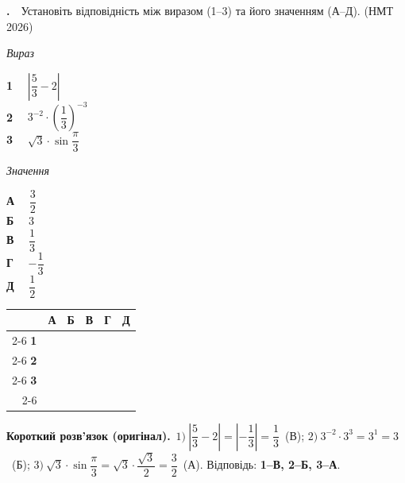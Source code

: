 \documentclass[12pt]{article}
\newcommand{\matchingGrid}{%
    \begingroup
    \renewcommand{\arraystretch}{1.15}
    \setlength{\tabcolsep}{4pt}
    \footnotesize
    \begin{tabular}{r|c|c|c|c|c|}
         \multicolumn{1}{c}{} & \multicolumn{1}{c}{\textbf{А}} & \multicolumn{1}{c}{\textbf{Б}} & \multicolumn{1}{c}{\textbf{В}} & \multicolumn{1}{c}{\textbf{Г}} & \multicolumn{1}{c}{\textbf{Д}} \\ \cline{2-6}
         \textbf{1} & \phantom{X} & \phantom{X} & \phantom{X} & \phantom{X} & \phantom{X} \\ \cline{2-6}
         \textbf{2} & & & & & \\ \cline{2-6}
         \textbf{3} & & & & & \\ \cline{2-6}
    \end{tabular}
    \endgroup
}
\newcounter{zad}
\newcommand{\zadtask}[1]{\stepcounter{zad}\noindent\textbf{\thezad.}\ \ #1\par\vspace{0.2cm}}
\newcommand{\nmtyear}[1]{\hfill{\small\color{yearOrange}(НМТ #1)}}%
\newcommand{\solution}[1]{%
\par\vspace{0.12cm}
\begin{tcolorbox}[colback=titleBg!45, colframe=mainGreen!55, boxrule=0.4pt, arc=2pt,
    left=6pt, right=6pt, top=3pt, bottom=3pt, breakable]
\footnotesize\textbf{Короткий розв'язок (оригінал).}\ #1
\end{tcolorbox}
\par\vspace{0.12cm}
}
\begin{document}
\zadtask{Установіть відповідність між виразом (1--3) та його значенням (А--Д). \nmtyear{2026}

\vspace{0.3cm}

\noindent
\begin{minipage}[t]{0.52\textwidth}
\textit{Вираз} \par \vspace{0.2cm}
\textbf{1} \ \ $\left|\dfrac{5}{3} - 2\right|$\\[0.35cm]
\textbf{2} \ \ $3^{-2} \cdot \left(\dfrac{1}{3}\right)^{-3}$\\[0.35cm]
\textbf{3} \ \ $\sqrt{3} \cdot \sin\dfrac{\pi}{3}$
\end{minipage}
\begin{minipage}[t]{0.24\textwidth}
\textit{Значення} \par \vspace{0.2cm}
\textbf{А} \ \ $\dfrac{3}{2}$\\[0.15cm]
\textbf{Б} \ \ $3$\\[0.15cm]
\textbf{В} \ \ $\dfrac{1}{3}$\\[0.15cm]
\textbf{Г} \ \ $-\dfrac{1}{3}$\\[0.15cm]
\textbf{Д} \ \ $\dfrac{1}{2}$
\end{minipage}
\hfill
\begin{minipage}[t]{0.22\textwidth}
\vspace{-0.2cm}
\begin{flushright}\matchingGrid\end{flushright}
\end{minipage}
}
\solution{$1)\ \left|\dfrac{5}{3}-2\right|=\left|-\dfrac{1}{3}\right|=\dfrac{1}{3}$~(В); $2)\ 3^{-2}\cdot 3^{3}=3^{1}=3$~(Б); $3)\ \sqrt{3}\cdot\sin\dfrac{\pi}{3}=\sqrt{3}\cdot\dfrac{\sqrt{3}}{2}=\dfrac{3}{2}$~(А). Відповідь: \textbf{1--В, 2--Б, 3--А}.}
\end{document}

